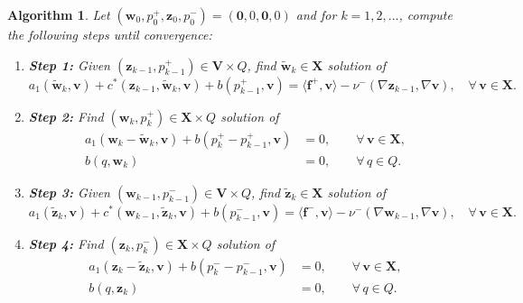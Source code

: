 \documentclass[3p]{elsarticle}
\newtheorem{algorithm}{Algorithm}[section]
\def\numinus{\nu^{-}}
\def\pplus{p^{+}}
\def\pminus{p^{-}}
\def\fplus{\mathbf{f}^{+}}
\def\fminus{\mathbf{f}^{-}}
\def\V#1{\mathbf{#1}}
\def\Vt#1{\mathbf{\tilde{#1}}}
\def\VX{\mathbf{X}}
\begin{document}
 \begin{algorithm}\label{algorithm:SIVS_Els}
Let $(\V{w}_0,\pplus_0,\V{z}_0,\pminus_0) = (\V{0},0,\V{0},0)$ and for $k = 1, 2, \ldots $, compute the following steps until convergence: 
\begin{enumerate}
\item[]{\bf Step 1:} Given $(\V{z}_{k-1}, \pplus_{k-1}) \in \V{V} \times Q$, find $\Vt{w}_{k} \in \VX$ solution of 
\begin{equation}
\label{eq:SIVS1_Els}
a_1(\Vt{w}_{k}, \V{v})
+ c^*(\V{z}_{k-1}, \Vt{w}_{k}, \V{v})
+ b(\pplus_{k-1},\V{v}) = \langle \fplus, \V{v} \rangle - \numinus(\nabla \V{z}_{k-1},\nabla \V{v}), \quad \forall \, \V{v} \in \VX.
\end{equation}
\item[]{\bf Step 2:} Find $(\V{w}_{k}, \pplus_{k}) \in \VX  \times Q$ solution of 
\begin{equation}
\label{eq:SIVS2_Els}
\begin{aligned}
a_1(\V{w}_{k} - \Vt{w}_{k}, \V{v}) + 
  b(\pplus_{k}-\pplus_{k-1}, \V{v}) & = 0
, \qquad \forall \, \V{v} \in \VX, \\
b(q,\V{w}_{k}) & = 0, \qquad \forall \, q \in Q.
\end{aligned}
\end{equation}
\item[]{\bf Step 3:} Given $(\V{w}_{k-1}, \pminus_{k-1}) \in \V{V} \times Q$, find $\Vt{z}_{k} \in \VX$ solution of 
\begin{equation}
\label{eq:SIVS3_Els}
a_1(\Vt{z}_{k}, \V{v})
+ c^*(\V{w}_{k-1}, \Vt{z}_{k}, \V{v})
+ b(\pminus_{k-1},\V{v}) = \langle \fminus, \V{v} \rangle - \numinus(\nabla \V{w}_{k-1},\nabla \V{v}), \quad \forall \, \V{v} \in \VX.
\end{equation}
\item[]{\bf Step 4:} Find $(\V{z}_{k}, \pminus_{k}) \in \VX  \times Q$ solution of 
\begin{equation}
\label{eq:SIVS4_Els}
\begin{aligned}
a_1(\V{z}_{k} - \Vt{z}_{k}, \V{v}) + 
  b(\pminus_{k}-\pminus_{k-1}, \V{v}) & = 0
, \qquad \forall \, \V{v} \in \VX, \\
b(q,\V{z}_{k}) & = 0, \qquad \forall \, q \in Q.
\end{aligned}
\end{equation}
\end{enumerate}
\end{algorithm}
\end{document}
